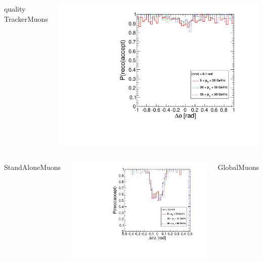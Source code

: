 \documentclass[compress]{beamer}
\begin{document}
\begin{frame}
\begin{columns}
\centering quality TrackerMuons

\includegraphics[width=\linewidth]{endcap_dphi_bypt_TrackerMuon.pdf}
\end{columns}

\begin{columns}
\centering StandAloneMuons

\includegraphics[width=\linewidth]{endcap_dr_bypt_StandAloneMuon.pdf}

\centering GlobalMuons


\end{columns}
\end{frame}
\end{document}
